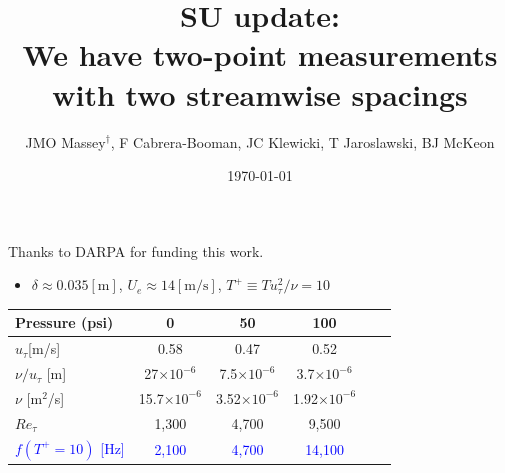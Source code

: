 \documentclass[aspectratio=169,9pt]{beamer}
\title{SU update: \\ We have two-point measurements with two streamwise spacings}
\author{JMO Massey$^{\dag}$, F Cabrera-Booman, JC Klewicki, T Jaroslawski, BJ McKeon}
\institute{Center for Turbulence Research \\ Stanford University}
\date{\today}
\begin{document}
\begin{frame}
    \setcounter{framenumber}{0}
    \titlepage
    \vfill
    {\scriptsize \centering Thanks to DARPA for funding this work.\par}
\end{frame}

\begin{frame}

    \begin{itemize}
        \item $\delta\approx 0.035[\mathrm{m}]$, $U_e \approx14[\mathrm{m/s}]$, $T^+\equiv T u_\tau^2/\nu=10$
    \end{itemize}
    \begin{table}[]
        \centering
        \begin{tabular}{lccccc}
        \toprule
        Pressure (psi) & 0  &  50 & 100 \\
        \midrule
        $u_\tau$[m/s] & 0.58 & 0.47 & 0.52 \\
        $\nu/u_\tau$ [m] & 27$\times 10^{-6}$ & 7.5$\times 10^{-6}$ & 3.7$\times 10^{-6}$ \\
        $\nu$ [m$^2$/s] & 15.7$\times 10^{-6}$ & 3.52$\times 10^{-6}$ & 1.92$\times 10^{-6}$ \\
        $Re_\tau$ & 1,300 & 4,700 & 9,500 \\
        \textcolor{blue}{$f(T^+=10)$ [Hz]} & \textcolor{blue}{2,100} & \textcolor{blue}{4,700} & \textcolor{blue}{14,100} \\
        \bottomrule
        \end{tabular}
    \end{table}

\end{frame}
\end{document}
